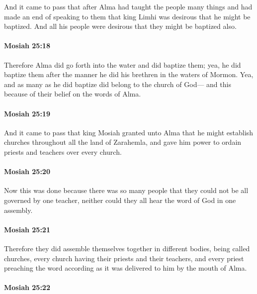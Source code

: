 			And it came to pass that
			after Alma had taught the people many things
			and had made an end of speaking to them
			that king Limhi was desirous that he might be baptized.
			And all his people were desirous that they might be baptized also.

		\paragraph{Mosiah 25:18} %
			\label{MOSIAH-25-18}

			Therefore Alma did go forth into the water and did baptize them;
			yea, he did baptize them
			after the manner he did his brethren in the waters of Mormon.
			Yea, and as many as he did baptize did belong to the church of God---
			and this because of their belief on the words of Alma.

		\paragraph{Mosiah 25:19} %
			\label{MOSIAH-25-19}

			And it came to pass that king Mosiah granted unto Alma
			that he might establish churches throughout all the land of Zarahemla,
			and gave him power to ordain priests and teachers over every church.

		\paragraph{Mosiah 25:20} %
			\label{MOSIAH-25-20}

			Now this was done because there was so many people
			that they could not be all governed by one teacher,
			neither could they all hear the word of God in one assembly.

		\paragraph{Mosiah 25:21} %
			\label{MOSIAH-25-21}

			Therefore they did assemble themselves together in different bodies,
			being called churches,
			every church having their priests and their teachers,
			and every priest preaching the word
			according as it was delivered to him by the mouth of Alma.

		\paragraph{Mosiah 25:22} %
			\label{MOSIAH-25-22}

